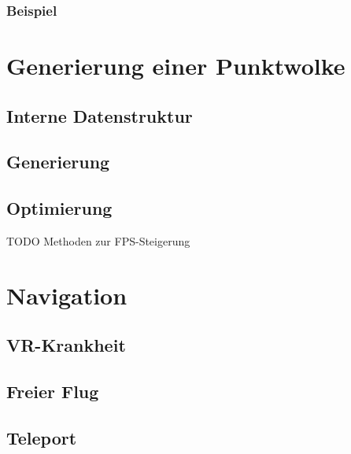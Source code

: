\subsubsection{Beispiel}

\section{Generierung einer Punktwolke}
\label{sec:Generierung}

\subsection{Interne Datenstruktur}
\label{sec:IDS}

\subsection{Generierung}
\label{sec:PclGenerate}


\subsection{Optimierung}
TODO
Methoden zur FPS-Steigerung

%	
%
%
%
%

\section{Navigation}
\label{sec:Navigation}
\subsection{VR-Krankheit}
\subsection{Freier Flug}
\subsection{Teleport}

